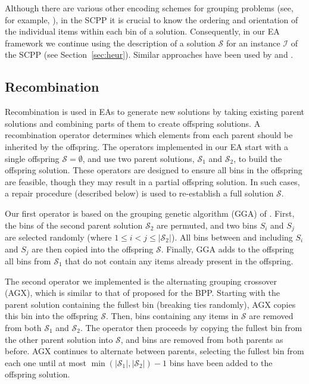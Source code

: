 \documentclass[a4paper,11pt,authoryear]{elsarticle}
\begin{document}
Although there are various other encoding schemes for grouping problems (see, for example, \citet{falkenauer1993}), in the SCPP it is crucial to know the ordering and orientation of the individual items within each bin of a solution. Consequently, in our EA framework we continue using the description of a solution $\mathcal{S}$ for an instance $\mathcal{I}$ of the SCPP (see Section~\ref{sec:heur}). Similar approaches have been used by \citet{galinier1999} and \citet{lewis2017}.

\subsection{Recombination}
\label{sub:recomb}

\noindent Recombination is used in EAs to generate new solutions by taking existing parent solutions and combining parts of them to create offspring solutions. A recombination operator determines which elements from each parent should be inherited by the offspring. The operators implemented in our EA start with a single offspring $\mathcal{S} = \emptyset$, and use two parent solutions, $\mathcal{S}_1$ and $\mathcal{S}_2$, to build the offspring solution. These operators are designed to ensure all bins in the offspring are feasible, though they may result in a partial offspring solution. In such cases, a repair procedure (described below) is used to re-establish a full solution $\mathcal{S}$.

Our first operator is based on the grouping genetic algorithm (GGA) of \cite{falkenauer1992}. First, the bins of the second parent solution $\mathcal{S}_2$ are permuted, and two bins $S_i$ and $S_j$ are selected randomly (where $1 \leq i < j \leq |\mathcal{S}_2|$). All bins between and including $S_i$ and $S_j$ are then copied into the offspring $\mathcal{S}$. Finally, GGA adds to the offspring all bins from $\mathcal{S}_1$ that do not contain any items already present in the offspring.

The second operator we implemented is the alternating grouping crossover (AGX), which is similar to that of \cite{quiroz2015} proposed for the BPP. Starting with the parent solution containing the fullest bin (breaking ties randomly), AGX copies this bin into the offspring $\mathcal{S}$. Then, bins containing any items in $\mathcal{S}$ are removed from both $\mathcal{S}_1$ and $\mathcal{S}_2$. The operator then proceeds by copying the fullest bin from the other parent solution into $\mathcal{S}$, and bins are removed from both parents as before. AGX continues to alternate between parents, selecting the fullest bin from each one until at most $\min (|\mathcal{S}_1|,|\mathcal{S}_2|) - 1$ bins have been added to the offspring solution.
\end{document}

